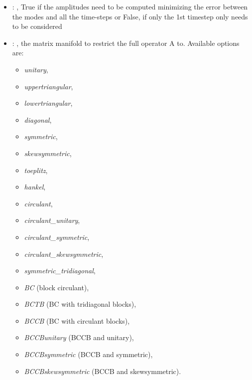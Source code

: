 \begin{itemize}
    \item {}: ,
      True if the amplitudes need to be computed minimizing the error
      between the modes and all the time-steps or False, if only the 1st timestep only needs to be
      considered

    \item {}: ,
      the matrix manifold to restrict the full operator A to. Available options are:
      \begin{itemize}                                                   \item \textit{unitary},
      \item \textit{uppertriangular},                                                   \item
      \textit{lowertriangular},                                                   \item
      \textit{diagonal},                                                   \item \textit{symmetric},
      \item \textit{skewsymmetric},                                                   \item
      \textit{toeplitz},                                                   \item \textit{hankel},
      \item \textit{circulant},                                                   \item
      \textit{circulant\_unitary},                                                   \item
      \textit{circulant\_symmetric},                                                   \item
      \textit{circulant\_skewsymmetric},                                                   \item
      \textit{symmetric\_tridiagonal},                                                   \item
      \textit{BC} (block circulant),                                                   \item
      \textit{BCTB} (BC with tridiagonal blocks),
      \item \textit{BCCB} (BC with circulant blocks),
      \item \textit{BCCBunitary} (BCCB and unitary),
      \item \textit{BCCBsymmetric} (BCCB and symmetric),
      \item \textit{BCCBskewsymmetric} (BCCB and skewsymmetric).
      \end{itemize}


\end{itemize}
